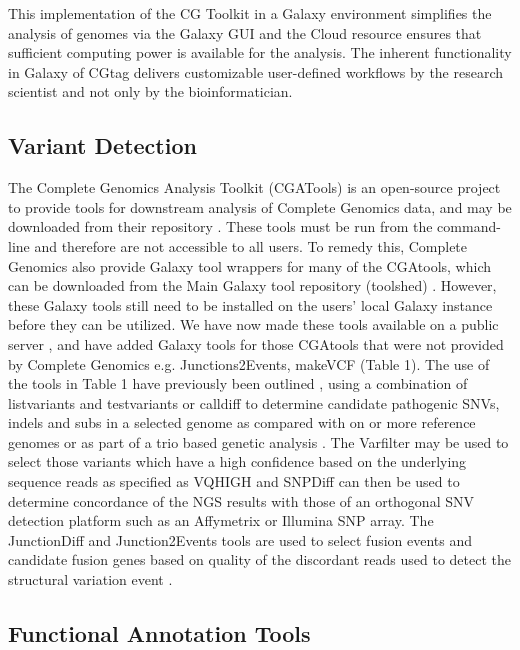 This implementation of the CG Toolkit in a Galaxy environment simplifies the analysis of genomes via the Galaxy GUI and the Cloud resource ensures that sufficient computing power is available for the analysis.  The inherent functionality in Galaxy of CGtag delivers customizable user-defined workflows by the research scientist and not only by the bioinformatician.


\subsection*{Variant Detection}

The Complete Genomics Analysis Toolkit (CGATools) is an open-source project to provide tools for downstream analysis of Complete Genomics data, and may be downloaded from their repository \cite{url-cgatools}. These tools must be run from the command-line and therefore are not accessible to all users. To remedy this, Complete Genomics also provide Galaxy tool wrappers for many of the CGAtools, which can be downloaded from the Main Galaxy tool repository (toolshed) \cite{url-toolshed}. However, these Galaxy tools still need to be installed on the users’ local Galaxy instance before they can be utilized. We have now made these tools available on a public server \cite{url-nbicgalaxy}, and have added Galaxy tools for those CGAtools that were not provided by Complete Genomics e.g. Junctions2Events, makeVCF (Table 1).  The use of the tools in Table 1 have previously been outlined \cite{nieminen}, using a combination of listvariants and testvariants or calldiff to determine candidate pathogenic SNVs, indels and subs in a selected genome as compared with on or more reference genomes or as part of a trio based genetic analysis \cite{nieminen}.  The Varfilter may be used to select those variants which have a high confidence based on the underlying sequence reads as specified as VQHIGH and SNPDiff can then be used to determine concordance of the NGS results with those of an orthogonal SNV detection platform such as an Affymetrix or Illumina SNP array.  The JunctionDiff and Junction2Events tools are used to select fusion events and candidate fusion genes based on quality of the discordant reads used to detect the structural variation event \cite{ifuse}.


\subsection*{Functional Annotation Tools}

